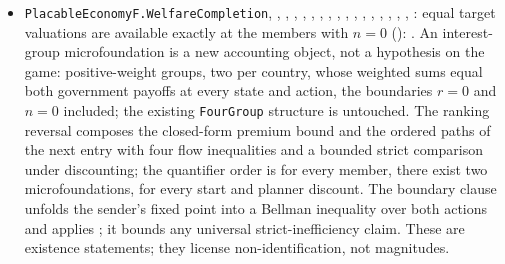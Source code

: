 \begin{itemize}[leftmargin=1.4em,itemsep=1pt]
\item \texttt{PlacableEconomyF.WelfareCompletion}, , , , , , , , , , , , , , , , , : equal target valuations are available exactly at the members with $n=0$ (): . An interest-group microfoundation is a new accounting object, not a hypothesis on the game: positive-weight groups, two per country, whose weighted sums equal both government payoffs at every state and action, the boundaries $r=0$ and $n=0$ included; the existing \texttt{FourGroup} structure is untouched. The ranking reversal composes the closed-form premium bound and the ordered paths of the next entry with four flow inequalities and a bounded strict comparison under discounting; the quantifier order is for every member, there exist two microfoundations, for every start and planner discount. The boundary clause unfolds the sender's fixed point into a Bellman inequality over both actions and applies ; it bounds any universal strict-inefficiency claim. These are existence statements; they license non-identification, not magnitudes.

\end{itemize}
